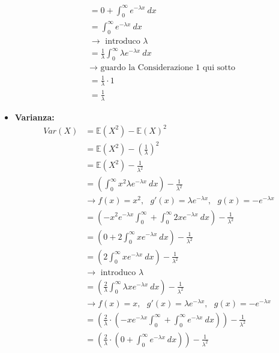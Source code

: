 \documentclass[11pt]{report}
\begin{document}
\begin{itemize}
\begin{equation}
\begin{split}
            & = 0 + \int_0^\infty e^{-\lambda x}\ dx\\
            & = \int_0^\infty e^{-\lambda x}\ dx\\
            & \rightarrow \text{ introduco } \lambda\\
            & = \frac{1}{\lambda} \int_0^\infty \lambda e^{-\lambda x}\ dx\\
            & \rightarrow \text{ guardo la Considerazione 1 qui sotto}\\
            & = \frac{1}{\lambda} \cdot 1\\
            & = \frac{1}{\lambda}
		\end{split}
    \end{equation}
    \item \textbf{Varianza:}
    \begin{equation}
    	\begin{split}
   			Var(X) & = \mathbb{E}(X^2) - \mathbb{E}(X)^2\\
            & = \mathbb{E}(X^2) - \left( \frac{1}{\lambda} \right)^2\\
            & = \mathbb{E}(X^2) - \frac{1}{\lambda^2}\\
            & = \left( \int_0^\infty x^2 \lambda e^{-\lambda x}\ dx \right) - \frac{1}{\lambda^2}\\
            & \rightarrow f(x)=x^2,\ \ \ g'(x)=\lambda e^{-\lambda x},\ \ \ g(x)=-e^{-\lambda x}\\
            & = \left( -x^2e^{-\lambda x} \int_0^\infty + \int_0^\infty 2x e^{-\lambda x}\ dx \right) - \frac{1}{\lambda^2}\\
            & = \left( 0 + 2 \int_0^\infty x e^{-\lambda x}\ dx \right) - \frac{1}{\lambda^2}\\
            & = \left( 2 \int_0^\infty x e^{-\lambda x}\ dx \right) - \frac{1}{\lambda^2}\\
            & \rightarrow \text{ introduco } \lambda\\
            & = \left( \frac{2}{\lambda} \int_0^\infty \lambda x e^{-\lambda x}\ dx \right) - \frac{1}{\lambda^2}\\
            & \rightarrow f(x)=x,\ \ \ g'(x)=\lambda e^{-\lambda x},\ \ \ g(x)=-e^{-\lambda x}\\
            & = \left( \frac{2}{\lambda} \cdot \left( -xe^{-\lambda x} \int_0^\infty + \int_0^\infty e^{-\lambda x}\ dx \right) \right) - \frac{1}{\lambda^2}\\
            & = \left( \frac{2}{\lambda} \cdot \left( 0 + \int_0^\infty e^{-\lambda x}\ dx \right) \right) - \frac{1}{\lambda^2}\\

\end{split}
\end{equation}
\end{itemize}
\end{document}
